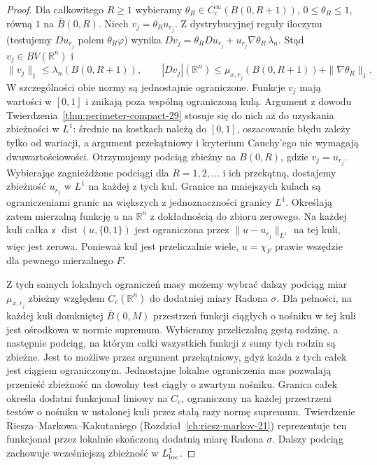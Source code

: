 \begin{proof}
Dla całkowitego $R\ge1$ wybieramy
$\theta_R\in C_c^\infty(B(0,R+1))$,
$0\le\theta_R\le1$, równą $1$ na $\overline B(0,R)$.
Niech $v_j=\theta_R u_{r_j}$.
Z dystrybucyjnej reguły iloczynu (testujemy
$Du_{r_j}$ polem $\theta_R\varphi$) wynika
$Dv_j=\theta_R Du_{r_j}+u_{r_j}\nabla\theta_R\,\lambda_n$.
Stąd $v_j\in BV(\mathbb R^n)$ i
\[
 \|v_j\|_1\le\lambda_n(B(0,R+1)),\qquad
 |Dv_j|(\mathbb R^n)
 \le\mu_{x,r_j}(B(0,R+1))+\|\nabla\theta_R\|_1.
\]
W szczególności obie normy są jednostajnie
ograniczone. Funkcje $v_j$ mają wartości w $[0,1]$
i znikają poza wspólną ograniczoną kulą.
Argument z dowodu Twierdzenia~\ref{thm:perimeter-compact-29}
stosuje się do nich aż do uzyskania zbieżności
w $L^1$: średnie na kostkach należą do $[0,1]$,
oszacowanie błędu zależy tylko od wariacji,
a argument przekątniowy i kryterium Cauchy'ego
nie wymagają dwuwartościowości.
Otrzymujemy podciąg zbieżny na $B(0,R)$,
gdzie $v_j=u_{r_j}$. Wybierając zagnieżdżone
podciągi dla $R=1,2,\ldots$ i ich przekątną,
dostajemy zbieżność $u_{r_j}$ w $L^1$ na każdej
z tych kul. Granice na mniejszych kulach są
ograniczeniami granic na większych z jednoznaczności
granicy $L^1$. Określają zatem mierzalną funkcję $u$
na $\mathbb R^n$ z dokładnością do zbioru zerowego.
Na każdej kuli całka z
$\operatorname{dist}(u,\{0,1\})$ jest ograniczona
przez $\|u-u_{r_j}\|_{L^1}$ na tej kuli,
więc jest zerowa. Ponieważ kul jest przeliczalnie
wiele, $u=\chi_F$ prawie wszędzie dla pewnego
mierzalnego $F$.

Z tych samych lokalnych ograniczeń masy możemy
wybrać dalszy podciąg miar $\mu_{x,r_j}$ zbieżny
względem $C_c(\mathbb R^n)$ do dodatniej miary Radona
$\sigma$. Dla pełności, na każdej kuli domkniętej
$\overline B(0,M)$ przestrzeń funkcji ciągłych
o nośniku w tej kuli jest ośrodkowa w normie
supremum. Wybieramy przeliczalną gęstą rodzinę,
a następnie podciąg, na którym całki wszystkich
funkcji z sumy tych rodzin są zbieżne.
Jest to możliwe przez argument przekątniowy,
gdyż każda z tych całek jest ciągiem ograniczonym.
Jednostajne lokalne ograniczenia mas pozwalają
przenieść zbieżność na dowolny test ciągły
o zwartym nośniku. Granica całek określa dodatni
funkcjonał liniowy na $C_c$, ograniczony na każdej
przestrzeni testów o nośniku w ustalonej kuli
przez stałą razy normę supremum.
Twierdzenie Riesza--Markowa--Kakutaniego
(Rozdział~\ref{ch:riesz-markov-21}) reprezentuje
ten funkcjonał przez lokalnie skończoną dodatnią
miarę Radona $\sigma$. Dalszy podciąg zachowuje
wcześniejszą zbieżność w $L^1_{\rm loc}$.


\end{proof}
